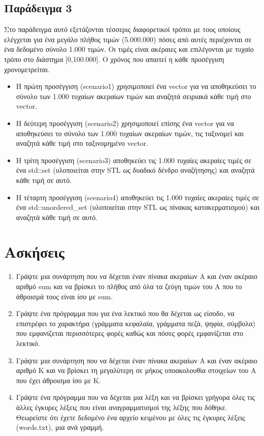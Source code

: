 \subsection{Παράδειγμα 3}
Στο παράδειγμα αυτό εξετάζονται τέσσερις διαφορετικοί τρόποι με τους οποίους ελέγχεται για ένα μεγάλο πλήθος τιμών (5.000.000) πόσες από αυτές περιέχονται σε ένα δεδομένο σύνολο 1.000 τιμών. Οι τιμές είναι ακέραιες και επιλέγονται με τυχαίο τρόπο στο διάστημα [0,100.000]. Ο χρόνος που απαιτεί η κάθε προσέγγιση χρονομετρείται.
\begin{itemize}[noitemsep]
\item Η πρώτη προσέγγιση (scenario1) χρησιμοποιεί ένα vector για να αποθηκεύσει το σύνολο των 1.000 τυχαίων ακεραίων τιμών και αναζητά σειριακά κάθε τιμή στο vector. 
\item Η δεύτερη προσέγγιση (scenario2) χρησιμοποιεί επίσης ένα vector για να αποθηκεύσει το σύνολο των 1.000 τυχαίων ακεραίων τιμών, τις ταξινομεί και αναζητά κάθε τιμή στο ταξινομημένο vector. 
\item Η τρίτη προσέγγιση (scenario3) αποθηκεύει τις 1.000 τυχαίες ακεραίες τιμές σε ένα std::set (υλοποιείται στην STL ως δυαδικό δένδρο αναζήτησης) και αναζητά κάθε τιμή σε αυτό. 
\item Η τέταρτη προσέγγιση (scenario4) αποθηκεύει τις 1.000 τυχαίες ακεραίες τιμές σε ένα std::unordered\_set (υλοποιείται στην STL ως πίνακας κατακερματισμού) και αναζητά κάθε τιμή σε αυτό.
\end{itemize}





\section{Ασκήσεις}
\begin{enumerate}
\item Γράψτε μια συνάρτηση που να δέχεται έναν πίνακα ακεραίων Α και έναν ακέραιο αριθμό sum και να βρίσκει το πλήθος από όλα τα ζεύγη τιμών του Α που το άθροισμά τους είναι ίσο με sum.
\item Γράψτε ένα πρόγραμμα που για ένα λεκτικό που θα δέχεται ως είσοδο, να επιστρέφει το χαρακτήρα (γράμματα κεφαλαία, γράμματα πεζά, ψηφία, σύμβολα) που εμφανίζεται περισσότερες φορές καθώς και πόσες φορές εμφανίζεται στο λεκτικό.
\item Γράψτε μια συνάρτηση που να δέχεται έναν πίνακα ακεραίων Α και έναν ακέραιο αριθμό Κ και να βρίσκει τη μεγαλύτερη σε μήκος υποακολουθία στοιχείων του Α που έχει άθροισμα ίσο με Κ.
\item Γράψτε ένα πρόγραμμα που να δέχεται μια λέξη και να βρίσκει γρήγορα όλες τις άλλες έγκυρες λέξεις που είναι αναγραμματισμοί της λέξης που δόθηκε. Θεωρείστε ότι έχετε δεδομένο ένα αρχείο κειμένου με όλες τις έγκυρες λέξεις (words.txt), μια ανά γραμμή.
\end{enumerate}

